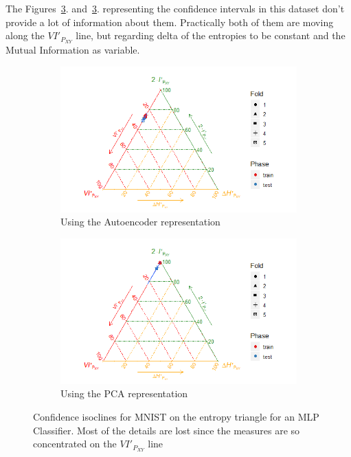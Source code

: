 The Figures~\ref{fig:figure_Mlp_MNIST_ET_Confidence}. and~\ref{fig:figure_Mlp_MNIST_ET_Confidence}. representing the confidence intervals in this dataset don't provide a lot of information about them. Practically both of them are moving along the $VI'_{P_{XY}}$ line, but regarding delta of the entropies to be constant and the Mutual Information as variable. 
%
\begin{figure}[H]
\begin{subfigure}{\textwidth}
	\centering
	\includegraphics[width=1\linewidth]{Figuras_tfg/MNIST_Autoencoder_mlp_Confidence}
	\caption{Using the Autoencoder representation}
    \label{fig:figure_Mlp_MNIST_ET_Auto_Confidence}
\end{subfigure}


\begin{subfigure}{\textwidth}
	\centering
	\includegraphics[width=1\linewidth]{Figuras_tfg/MNIST_PCA_mlp_Confidence}
	\caption{Using the PCA representation}
	\label{fig:figure_Mlp_MNIST_ET_PCA_Confidence}
\end{subfigure}

\caption{Confidence isoclines for MNIST on the entropy triangle for an MLP Classifier. Most of the details are lost since the measures are so concentrated on the $VI'_{P_{XY}}$ line}
	\label{fig:figure_Mlp_MNIST_ET_Confidence}
\end{figure}


